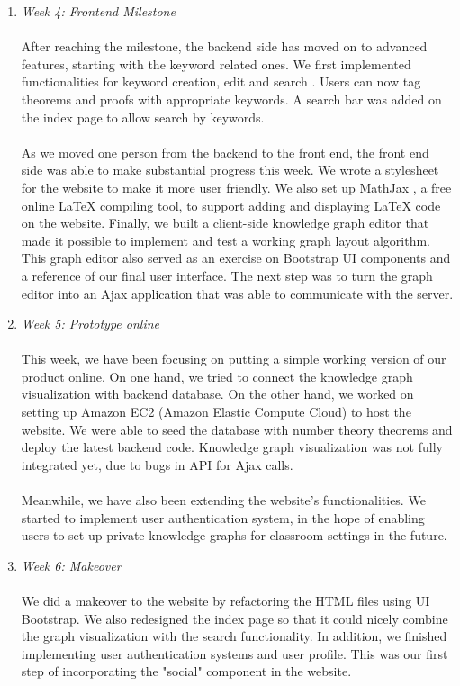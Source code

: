 \documentclass{acm_proc_article-sp}
\begin{document}
\begin{enumerate}
\item \emph{Week 4: Frontend Milestone}\\\\
After reaching the milestone, the backend side has moved on to advanced features, starting with the keyword related ones. We first implemented functionalities for keyword creation, edit and search . Users can now tag theorems and proofs with appropriate  keywords.  A search bar was added on the index page to allow search by keywords.\\\\
As we moved one person from the backend to the front end, the front end side was able to make substantial progress this week. We wrote a stylesheet for the website to make it more user friendly. We also set up MathJax \cite{MathJax}, a free online LaTeX compiling tool, to support adding and displaying LaTeX code on the website. Finally, we built a client-side knowledge graph editor that made it possible to implement and test a working graph layout algorithm. This graph editor also served as an exercise on Bootstrap UI components and a reference of our final user interface. The next step was to turn the graph editor into an Ajax application that was able to communicate with the server.\\

\item \emph{Week 5:  Prototype online}\\\\
This week, we have been focusing on putting a simple working version of our product online. On one hand, we tried to connect the knowledge graph visualization with backend database. On the other hand, we worked on setting up Amazon EC2 (Amazon Elastic Compute Cloud) to host the website. We were able to seed the database with number theory theorems and deploy the latest backend code. Knowledge graph visualization was not fully integrated yet, due to bugs in API for Ajax calls. \\\\
Meanwhile, we have also been extending the website's functionalities. We started to implement user authentication system, in the hope of enabling users to set up private knowledge graphs for classroom settings in the future.\\


\item \emph{Week 6: Makeover}\\\\
We did a makeover to the website by refactoring the HTML files using UI Bootstrap. We also redesigned the index page so that it could nicely combine the graph visualization with the search functionality.  In addition, we finished implementing user authentication systems and user profile. This was our first step of incorporating the "social" component in the website. \\


\end{enumerate}
\end{document}
